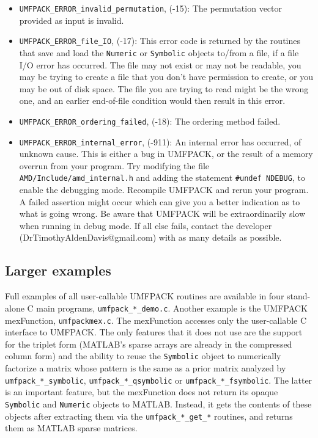 \documentclass[11pt]{article}
\begin{document}
\begin{itemize}
\item {\tt UMFPACK\_ERROR\_invalid\_permutation},  (-15):  
    The permutation vector provided as input is invalid.

\item {\tt UMFPACK\_ERROR\_file\_IO},  (-17):  
    This error code is returned by the routines that save and load
    the {\tt Numeric} or {\tt Symbolic} objects to/from a file, if a
    file I/O error has occurred.  The file may not exist or may not be readable,
    you may be trying to create a file that you don't have permission to create,
    or you may be out of disk space.  The file you are trying to read might
    be the wrong one, and an earlier end-of-file condition would then result
    in this error.

\item {\tt UMFPACK\_ERROR\_ordering\_failed},  (-18):
    The ordering method failed.

\item {\tt UMFPACK\_ERROR\_internal\_error},  (-911):  
    An internal error has occurred, of unknown cause.  This is either a bug
    in UMFPACK, or the result of a memory overrun from your program.
    Try modifying the file {\tt AMD/Include/amd\_internal.h} and adding
    the statement {\tt \#undef NDEBUG}, to enable the debugging mode.
    Recompile UMFPACK and rerun your program.
    A failed assertion might occur which
    can give you a better indication as to what is going wrong.  Be aware that
    UMFPACK will be extraordinarily slow when running in debug mode.
    If all else fails, contact the developer (DrTimothyAldenDavis@gmail.com)
    with as many details as possible.

\end{itemize}

\subsection{Larger examples}

Full examples of all user-callable UMFPACK routines
are available in four stand-alone C main programs, {\tt umfpack\_*\_demo.c}.
Another example is
the UMFPACK mexFunction, {\tt umfpackmex.c}.  The mexFunction accesses only the
user-callable C interface to UMFPACK.  The only features that it does not use
are the support for the triplet form (MATLAB's sparse arrays are already in the
compressed column form) and the ability to reuse the {\tt Symbolic} object to
numerically factorize a matrix whose pattern is the same as a prior matrix
analyzed by {\tt umfpack\_*\_symbolic},
{\tt umfpack\_*\_qsymbolic} or
{\tt umfpack\_*\_fsymbolic}.
The
latter is an important feature, but the mexFunction does not return its opaque
{\tt Symbolic} and {\tt Numeric} objects to MATLAB.  Instead, it gets the
contents of these objects after extracting them via the {\tt umfpack\_*\_get\_*}
routines, and returns them as MATLAB sparse matrices.
\end{document}
